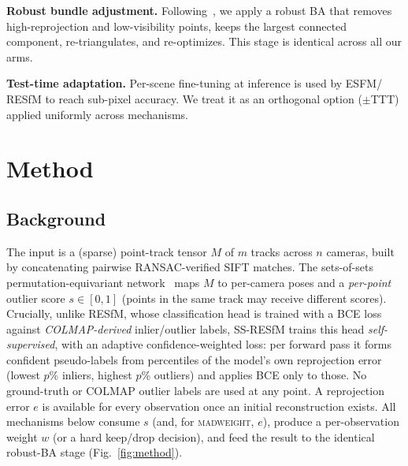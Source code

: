 \documentclass[10pt,twocolumn,letterpaper]{article}
\newcommand{\mad}{\textsc{madweight}}
\begin{document}
\noindent\textbf{Robust bundle adjustment.} Following~\cite{resfm}, we apply a robust BA
that removes high-reprojection and low-visibility points, keeps the largest connected
component, re-triangulates, and re-optimizes. This stage is identical across all our arms.

\noindent\textbf{Test-time adaptation.} Per-scene fine-tuning at inference is used by ESFM/
RESfM to reach sub-pixel accuracy. We treat it as an orthogonal option ($\pm$TTT) applied
uniformly across mechanisms.

\section{Method}
\subsection{Background}
The input is a (sparse) point-track tensor $M$ of $m$ tracks across $n$ cameras, built by
concatenating pairwise RANSAC-verified SIFT matches. The sets-of-sets permutation-equivariant
network~\cite{resfm,esfm} maps $M$ to per-camera poses and a \emph{per-point} outlier score
$s\in[0,1]$ (points in the same track may receive different scores). Crucially, unlike RESfM,
whose classification head is trained with a BCE loss against \emph{COLMAP-derived}
inlier/outlier labels, SS-RESfM trains this head \emph{self-supervised}, with an adaptive
confidence-weighted loss: per forward pass it forms confident pseudo-labels from percentiles
of the model's own reprojection error (lowest $p$\% inliers, highest $p$\% outliers) and
applies BCE only to those. No ground-truth or COLMAP outlier labels are used at any point.
A reprojection error $e$ is available for every observation once an initial reconstruction
exists. All mechanisms below consume $s$ (and, for \mad{}, $e$),
produce a per-observation weight $w$ (or a hard keep/drop decision), and feed the result to
the identical robust-BA stage (Fig.~\ref{fig:method}).
\end{document}
